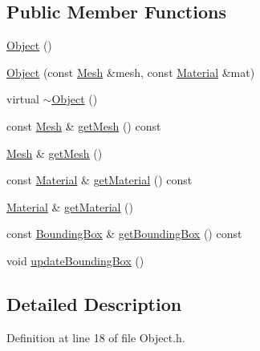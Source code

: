 \subsection*{Public Member Functions}
\begin{DoxyCompactItemize}
\item 
\hyperlink{class_object_a40860402e64d8008fb42329df7097cdb}{Object} ()
\item 
\hyperlink{class_object_a76be6ce9d41e65e06f231ba122c4c6f1}{Object} (const \hyperlink{class_mesh}{Mesh} \&mesh, const \hyperlink{class_material}{Material} \&mat)
\item 
virtual \hyperlink{class_object_aa3e791419d84c4c346ef9499513b8e00}{$\sim$Object} ()
\item 
const \hyperlink{class_mesh}{Mesh} \& \hyperlink{class_object_aca85febe503b1feffdd61cc22777816d}{getMesh} () const 
\item 
\hyperlink{class_mesh}{Mesh} \& \hyperlink{class_object_a2c80996c263bb223ff6a5395d452b2a7}{getMesh} ()
\item 
const \hyperlink{class_material}{Material} \& \hyperlink{class_object_a8b4f09c5a0ab51e58a1d1c2da6f33a18}{getMaterial} () const 
\item 
\hyperlink{class_material}{Material} \& \hyperlink{class_object_acda0cee83fc08cc69bdc3f72b8e8b3a7}{getMaterial} ()
\item 
const \hyperlink{class_bounding_box}{BoundingBox} \& \hyperlink{class_object_a39c1127b2bd6ced2ec79bb80f129301b}{getBoundingBox} () const 
\item 
void \hyperlink{class_object_a8b5067250bb4000f2e2abc79a5c0f0ef}{updateBoundingBox} ()
\end{DoxyCompactItemize}


\subsection{Detailed Description}


Definition at line 18 of file Object.h.



